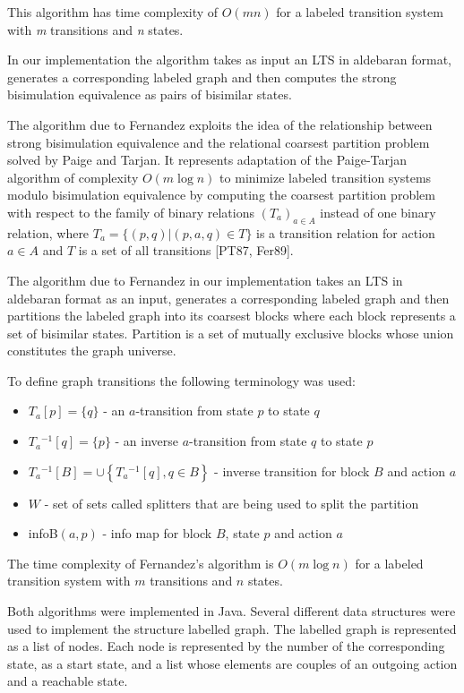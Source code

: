 This algorithm has time complexity of $O(mn)$ for a labeled transition system with
\emph{m} transitions and \emph{n} states. 

In our implementation the algorithm takes as input an LTS in aldebaran format, generates a corresponding labeled 
graph and then computes the strong bisimulation equivalence as pairs of bisimilar states.

The algorithm due to Fernandez exploits the idea of the relationship between strong bisimulation equivalence 
and the relational coarsest partition problem solved by Paige and Tarjan. It represents adaptation of the 
Paige-Tarjan algorithm of complexity $O(m \log n)$ to minimize labeled transition systems modulo bisimulation 
equivalence by computing the coarsest partition problem with respect to the family of binary relations 
$\left(T_a\right)_{a\in A}$ instead of one binary relation, where $T_a=\{(p,q)|(p,a,q)\in T\}$ is a transition 
relation for action ${a\in A}$ and $T$ is a set of all transitions [PT87, Fer89].

The algorithm due to Fernandez in our implementation takes an LTS in aldebaran format as an input, generates a 
corresponding labeled graph and then partitions the labeled graph into its coarsest blocks where each block represents 
a set of bisimilar states. Partition is a set of mutually exclusive blocks whose union constitutes the graph universe.

To define graph transitions the following terminology was used: 

\begin{itemize}
	\item $T_a[p]=\{q\}$ - an $a$-transition from state $p$ to state $q$
	\item $T_a{}^{-1}[q]=\{p\}$ - an inverse $a$-transition from state $q$ to state $p$
	\item $T_a{}^{-1}[B]=\cup \left\{T_a{}^{-1}[q],q\in B\right\}$ - inverse transition for block $B$ and action $a$
	\item $W$ - set of sets called splitters that are being used to split the partition
	\item infoB$(a, p)$ - info map for block $B$, state $p$ and action $a$
\end{itemize}

The time complexity of Fernandez's algorithm is $O(m \log n)$ for a labeled transition system 
with $m$ transitions and $n$ states. 

Both algorithms were implemented in Java. Several different data structures were used to implement the structure
labelled graph. The labelled graph is represented as a list of nodes. Each node is represented by the number of the
corresponding state, as a start state, and a list whose elements are couples of an outgoing action and a reachable 
state. 


